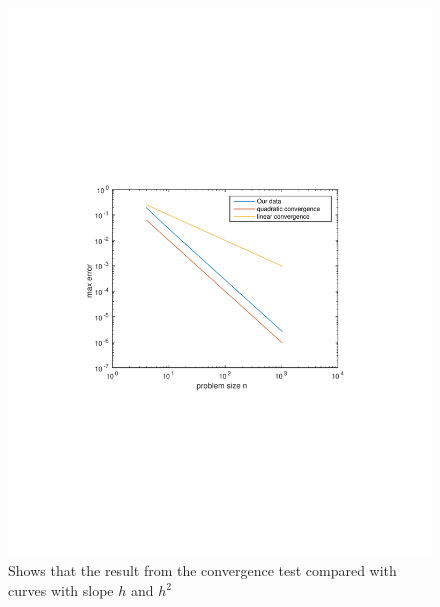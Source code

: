 
\begin{figure}[h]
\centering
\includegraphics[width=0.7\linewidth, trim= 3cm 8.5cm 3cm 9cm, clip=true]{checkConv}
\caption{Shows that the result from the convergence test compared with curves with slope $h$ and $h^2$}
\label{fig:checkConv}
\end{figure}